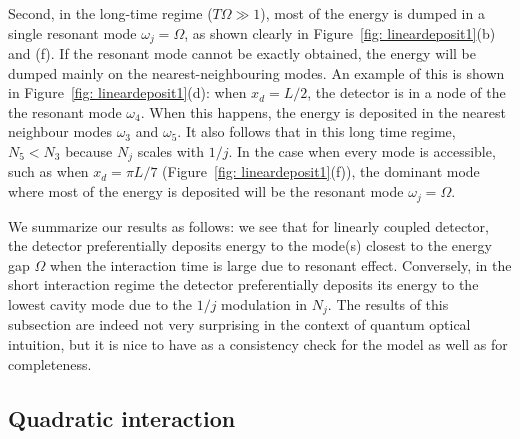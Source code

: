\documentclass[11pt,prd,onecolumn,superscriptaddress,nofootinbib,floatfix,amsmath,amssymb]{revtex4-2}
\begin{document}
    Second, in the long-time regime ($T\Omega\gg 1$), most of the energy is dumped in a single resonant mode $\omega_j = \Omega$, as shown clearly in Figure~\ref{fig: lineardeposit1}(b) and (f). If the resonant mode cannot be exactly obtained, the energy will be dumped mainly on the nearest-neighbouring modes. An example of this is shown in Figure~\ref{fig: lineardeposit1}(d): when $x_d=L/2$, the detector is in a node of the the resonant mode $\omega_4$. When this happens, the energy is deposited in the nearest neighbour modes $\omega_3$ and $\omega_5$. It also follows that in this long time regime, $N_5<N_3$ because $N_j$ scales with $1/j$. In the case when every mode is accessible, such as when $x_d = \pi L/7$ (Figure~\ref{fig: lineardeposit1}(f)), the dominant mode where most of the energy is deposited will be the resonant mode $\omega_j=\Omega$.
    
    
    We summarize our results as follows: we see that for linearly coupled detector, the detector preferentially deposits energy to the mode(s) closest to the energy gap $\Omega$ when the interaction time is large due to resonant effect. Conversely, in the short interaction regime the detector preferentially deposits its energy to the lowest cavity mode due to the $1/j$ modulation in $N_j$. The results of this subsection are indeed not very surprising in the context of quantum optical intuition, but it is nice to have as a consistency check for the model as well as for completeness.

        
    

    \subsection{Quadratic interaction}
    
\end{document}
